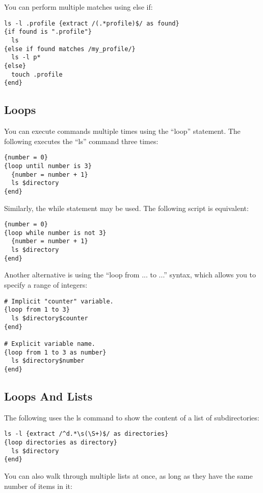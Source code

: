 You can perform multiple matches using else if: 

\begin{lstlisting}
ls -l .profile {extract /(.*profile)$/ as found}
{if found is ".profile"}
  ls
{else if found matches /my_profile/}
  ls -l p*
{else}
  touch .profile
{end}
\end{lstlisting}


\subsection{Loops}

You can execute commands multiple times using the ``loop'' statement. The 
following \product executes the ``ls'' command three times: 

\begin{lstlisting}
{number = 0}
{loop until number is 3}
  {number = number + 1}
  ls $directory
{end}
\end{lstlisting}

Similarly, the while statement may be used. The following script is 
equivalent: 

\begin{lstlisting}
{number = 0}
{loop while number is not 3}
  {number = number + 1}
  ls $directory
{end}
\end{lstlisting}

Another alternative is using the ``loop from ... to ...'' syntax, which 
allows you to specify a range of integers: 

\begin{lstlisting}
# Implicit "counter" variable.
{loop from 1 to 3}
  ls $directory$counter
{end}

# Explicit variable name.
{loop from 1 to 3 as number}
  ls $directory$number
{end}
\end{lstlisting}


\subsection{Loops And Lists}

The following \product uses the ls command to show the content of a list 
of subdirectories: 

\begin{lstlisting}
ls -l {extract /^d.*\s(\S+)$/ as directories}
{loop directories as directory}
  ls $directory
{end}
\end{lstlisting}

You can also walk through multiple lists at once, as long as they have the 
same number of items in it: 


